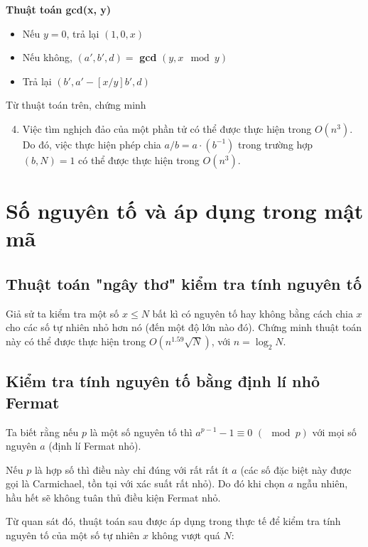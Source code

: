\documentclass{article}
\begin{document}
\textbf{Thuật toán \textbf{gcd}(x, y)}
\begin{itemize}
    \item Nếu $y = 0$, trả lại $(1, 0, x)$
    \item Nếu không, $(a', b', d) =$ \textbf{gcd} $(y, x\mod y)$
    \item Trả lại $(b', a'- [x/y]b', d)$
\end{itemize}
\begin{em}

Từ thuật toán trên, chứng minh

\begin{enumerate}
    \setcounter{enumi}{3}
    \item Việc tìm nghịch đảo của một phần tử có thể được thực hiện trong $O(n^3)$. Do đó, việc thực hiện phép chia $a/b = a\cdot (b^{-1})$ trong trường hợp $(b, N) = 1$ có thể được thực hiện trong $O(n^3)$.
\end{enumerate}
\end{em}

\section{Số nguyên tố và áp dụng trong mật mã}

\subsection{Thuật toán "ngây thơ" kiểm tra tính nguyên tố}
\begin{em}
    Giả sử ta kiểm tra một số $x \leq N$ bất kì có nguyên tố hay không bằng cách chia $x$ cho các số tự nhiên nhỏ hơn nó (đến một độ lớn nào đó). Chứng minh thuật toán này có thể được thực hiện trong $O(n^{1.59}\sqrt{N})$, với $n = \log_2 N$.
\end{em}

\subsection{Kiểm tra tính nguyên tố bằng định lí nhỏ Fermat}

Ta biết rằng nếu $p$ là một số nguyên tố thì $a^{p-1} - 1 \equiv 0$ $(\mod p)$ với mọi số nguyên $a$ (định lí Fermat nhỏ). 

Nếu $p$ là hợp số thì điều này chỉ đúng với rất rất ít $a$ (các số đặc biệt này được gọi là Carmichael, tồn tại với xác suất rất nhỏ). Do đó khi chọn $a$ ngẫu nhiên, hầu hết sẽ không tuân thủ điều kiện Fermat nhỏ. 

Từ quan sát đó, thuật toán sau được áp dụng trong thực tế để kiểm tra tính nguyên tố của một số tự nhiên $x$ không vượt quá $N$: 
\end{document}
